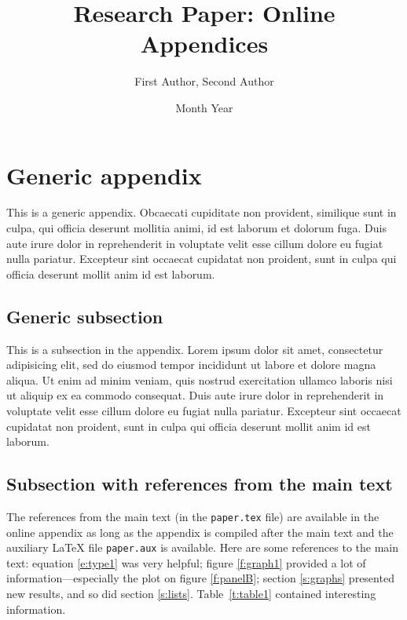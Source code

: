 \documentclass[letterpaper,11pt,leqno]{article}
\begin{document}
\title{Research Paper: Online Appendices}

\author{First Author, Second Author}

\date{Month Year}


\begin{titlepage}
\maketitle
\tableofcontents
\end{titlepage}

\section{Generic appendix}\label{a:appendix1}

This is a generic appendix. Obcaecati cupiditate non provident, similique sunt in culpa, qui officia deserunt mollitia animi, id est laborum et dolorum fuga. Duis aute irure dolor in reprehenderit in voluptate velit esse cillum dolore eu fugiat nulla pariatur. Excepteur sint occaecat cupidatat non proident, sunt in culpa qui officia deserunt mollit anim id est laborum. 

\subsection{Generic subsection} 

This is a subsection in the appendix. Lorem ipsum dolor sit amet, consectetur adipisicing elit, sed do eiusmod tempor incididunt ut labore et dolore magna aliqua. Ut enim ad minim veniam, quis nostrud exercitation ullamco laboris nisi ut aliquip ex ea commodo
consequat. Duis aute irure dolor in reprehenderit in voluptate velit esse
cillum dolore eu fugiat nulla pariatur. Excepteur sint occaecat cupidatat non
proident, sunt in culpa qui officia deserunt mollit anim id est laborum. 

\subsection{Subsection with references from the main text} 

The references from the main text (in the \texttt{paper.tex} file) are available in the online appendix as long as the appendix is compiled after the main text and the auxiliary LaTeX file \texttt{paper.aux} is available. Here are some references to the main text: equation \ref{e:type1} was very helpful; figure \ref{f:graph1} provided a lot of information---especially the plot on figure \ref{f:panelB}; section \ref{s:graphs} presented new results, and so did section \ref{s:lists}. Table~\ref{t:table1} contained interesting information.
\end{document}
